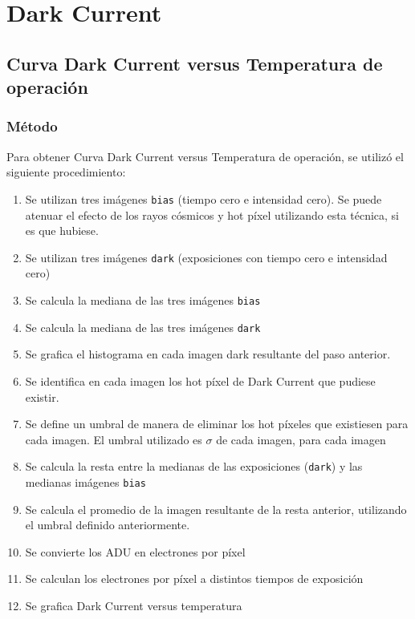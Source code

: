 \documentclass[a4paper,10pt]{article}
\begin{document}
\section{Dark Current}
\subsection{Curva Dark Current versus Temperatura de operación}
\subsubsection{Método}
Para obtener Curva Dark Current versus Temperatura de operación, se utilizó el siguiente procedimiento:
\begin{enumerate}
\item Se utilizan tres imágenes {\tt bias} (tiempo cero e  intensidad cero). Se puede atenuar el efecto de los rayos cósmicos y hot píxel utilizando esta técnica, si es que hubiese.
\item Se utilizan tres imágenes {\tt dark} (exposiciones con tiempo cero e intensidad cero)
\item Se calcula la mediana de las tres imágenes {\tt bias}
\item Se calcula la mediana de las tres imágenes {\tt dark}
\item Se grafica el histograma en cada imagen dark resultante del paso anterior.
\item Se identifica en cada imagen los hot píxel de Dark Current que pudiese existir.
\item Se define un umbral de manera de eliminar los hot píxeles que existiesen para cada imagen. El umbral utilizado es $\sigma$ de cada imagen, para cada imagen
\item Se calcula la resta entre la medianas de las exposiciones ({\tt dark}) y las medianas imágenes {\tt bias}
\item Se calcula el promedio de la imagen resultante de la resta anterior, utilizando el umbral definido anteriormente.
\item Se convierte los ADU en electrones por píxel
\item Se calculan los electrones por píxel a distintos tiempos de exposición
\item Se grafica Dark Current versus temperatura
\end{enumerate}
\end{document}
